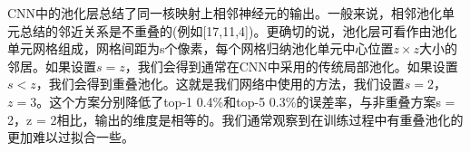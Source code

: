 CNN中的池化层总结了同一核映射上相邻神经元的输出。一般来说，相邻池化单元总结的邻近关系是不重叠的(例如[17,11,4])。更确切的说，池化层可看作由池化单元网格组成，网格间距为s个像素，每个网格归纳池化单元中心位置$z\times z$大小的邻居。如果设置$s=z$，我们会得到通常在CNN中采用的传统局部池化。如果设置$s < z$，我们会得到重叠池化。这就是我们网络中使用的方法，我们设置$s = 2$，$z = 3$。这个方案分别降低了top-1  0.4\%和top-5  0.3\%的误差率，与非重叠方案s = 2，z = 2相比，输出的维度是相等的。我们通常观察到在训练过程中有重叠池化的更加难以过拟合一些。